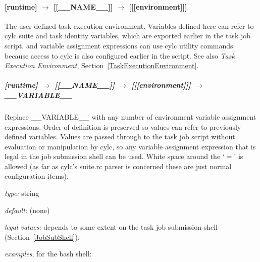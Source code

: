 \paragraph[{[[[}environment{]]]}]{[runtime] $\rightarrow$ [[\_\_NAME\_\_]] $\rightarrow$ [[[environment]]]}

The user defined task execution environment. Variables defined here can
refer to cylc suite and task identity variables, which are exported
earlier in the task job script, and variable assignment expressions can
use cylc utility commands because access to cylc is also configured
earlier in the script.  See also {\em Task Execution Environment},
Section~\ref{TaskExecutionEnvironment}.

\subparagraph[\_\_VARIABLE\_\_ ]{[runtime] $\rightarrow$ [[\_\_NAME\_\_]] $\rightarrow$ [[[environment]]] $\rightarrow$ \_\_VARIABLE\_\_}
\label{AppendixTaskExecutionEnvironment}

Replace \_\_VARIABLE\_\_ with any number of environment variable
assignment expressions.
Order of definition is preserved so values can refer to previously
defined variables. Values are passed through to the task job script
without evaluation or manipulation by cylc, so any variable assignment
expression that is legal in the job submission shell can be used. 
White space around the `$=$' is allowed (as far as cylc's suite.rc 
parser is concerned these are just normal configuration items).

\begin{myitemize}
\item {\em type:} string
\item {\em default:} (none)
\item {\em legal values:} depends to some extent on the task job
    submission shell (Section~\ref{JobSubShell}). 
\item {\em examples}, for the bash shell: 
\end{myitemize}

